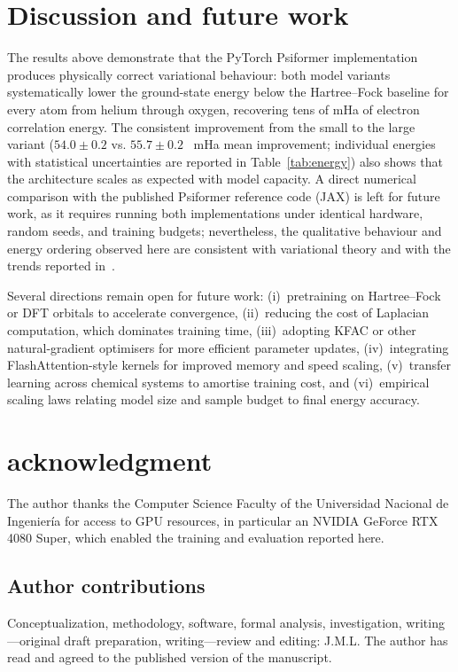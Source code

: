 \section{Discussion and future work}

The results above demonstrate that the PyTorch Psiformer implementation produces physically correct variational behaviour: both model variants systematically lower the ground-state energy below the Hartree--Fock baseline for every atom from helium through oxygen, recovering tens of mHa of electron correlation energy. The consistent improvement from the small to the large variant ($54.0\pm0.2$ vs. $55.7\pm0.2$ \, mHa mean improvement; individual energies with statistical uncertainties are reported in Table~\ref{tab:energy}) also shows that the architecture scales as expected with model capacity. A direct numerical comparison with the published Psiformer reference code (JAX) is left for future work, as it requires running both implementations under identical hardware, random seeds, and training budgets; nevertheless, the qualitative behaviour and energy ordering observed here are consistent with variational theory and with the trends reported in~\cite{psiformer}.

Several directions remain open for future work: (i)~pretraining on Hartree--Fock or DFT orbitals to accelerate convergence, (ii)~reducing the cost of Laplacian computation, which dominates training time, (iii)~adopting KFAC or other natural-gradient optimisers for more efficient parameter updates, (iv)~integrating FlashAttention-style kernels for improved memory and speed scaling, (v)~transfer learning across chemical systems to amortise training cost, and (vi)~empirical scaling laws relating model size and sample budget to final energy accuracy.

\section*{acknowledgment}
The author thanks the Computer Science Faculty of the Universidad Nacional de Ingenier\'{i}a for access to GPU resources, in particular an NVIDIA GeForce RTX 4080 Super, which enabled the training and evaluation reported here.

\subsection*{Author contributions}
Conceptualization, methodology, software, formal analysis, investigation, writing---original draft preparation, writing---review and editing: J.M.L. The author has read and agreed to the published version of the manuscript.

